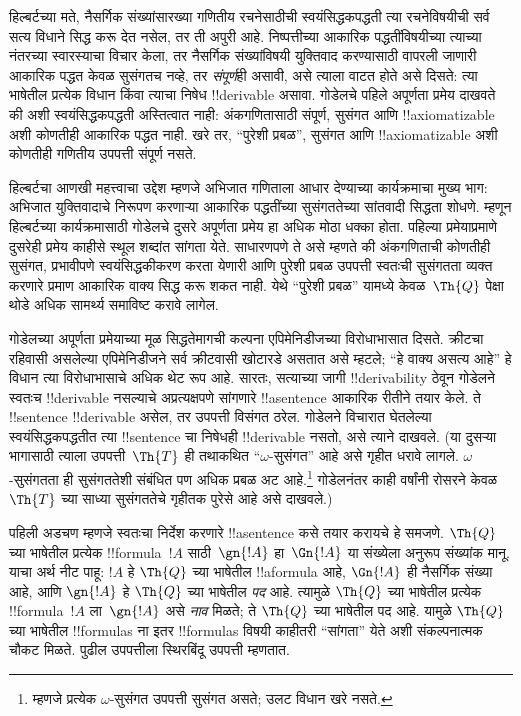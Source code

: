 \documentclass[../../../include/open-logic-section]{subfiles}
\begin{document}


हिल्बर्टच्या मते, नैसर्गिक संख्यांसारख्या गणितीय रचनेसाठीची
स्वयंसिद्धकपद्धती त्या रचनेविषयीची सर्व सत्य विधाने सिद्ध करू देत
नसेल, तर ती अपुरी आहे. निष्पत्तीच्या आकारिक पद्धतींविषयीच्या
त्याच्या नंतरच्या स्वारस्याचा विचार केला, तर नैसर्गिक संख्यांविषयी
युक्तिवाद करण्यासाठी वापरली जाणारी आकारिक पद्धत केवळ सुसंगतच
नव्हे, तर \emph{संपूर्ण}ही असावी, असे त्याला वाटत होते असे दिसते:
त्या भाषेतील प्रत्येक विधान किंवा त्याचा निषेध !!{derivable}
असावा. गोडेलचे पहिले अपूर्णता प्रमेय दाखवते की अशी
स्वयंसिद्धकपद्धती अस्तित्वात नाही: अंकगणितासाठी संपूर्ण, सुसंगत
आणि !!{axiomatizable} अशी कोणतीही आकारिक पद्धत नाही. खरे तर,
“पुरेशी प्रबळ”, सुसंगत आणि !!{axiomatizable} अशी कोणतीही
गणितीय उपपत्ती संपूर्ण नसते.

हिल्बर्टचा आणखी महत्त्वाचा उद्देश म्हणजे अभिजात गणिताला आधार
देण्याच्या कार्यक्रमाचा मुख्य भाग: अभिजात युक्तिवादाचे निरूपण
करणाऱ्या आकारिक पद्धतींच्या सुसंगततेच्या सांतवादी सिद्धता
शोधणे. म्हणून हिल्बर्टच्या कार्यक्रमासाठी गोडेलचे दुसरे
अपूर्णता प्रमेय हा अधिक मोठा धक्का होता. पहिल्या प्रमेयाप्रमाणे
दुसरेही प्रमेय काहीसे स्थूल शब्दांत सांगता येते. साधारणपणे ते
असे म्हणते की अंकगणिताची कोणतीही सुसंगत, प्रभावीपणे
स्वयंसिद्धकीकरण करता येणारी आणि पुरेशी प्रबळ उपपत्ती स्वतःची
सुसंगतता व्यक्त करणारे प्रमाण आकारिक वाक्य सिद्ध करू शकत नाही. येथे “पुरेशी प्रबळ” यामध्ये
केवळ~$\Th{Q}$ पेक्षा थोडे अधिक सामर्थ्य समाविष्ट करावे लागेल.

गोडेलच्या अपूर्णता प्रमेयाच्या मूळ सिद्धतेमागची कल्पना
एपिमेनिडीजच्या विरोधाभासात दिसते. क्रीटचा रहिवासी असलेल्या
एपिमेनिडीजने सर्व क्रीटवासी खोटारडे असतात असे म्हटले;
“हे वाक्य असत्य आहे” हे विधान त्या विरोधाभासाचे अधिक थेट
रूप आहे. सारतः, सत्याच्या जागी !!{derivability} ठेवून गोडेलने
स्वतःच !!{derivable} नसल्याचे अप्रत्यक्षपणे सांगणारे
!!a{sentence} आकारिक रीतीने तयार केले. ते !!{sentence}
!!{derivable} असेल, तर उपपत्ती विसंगत ठरेल. गोडेलने
विचारात घेतलेल्या स्वयंसिद्धकपद्धतीत त्या !!{sentence} चा
निषेधही !!{derivable} नसतो, असे त्याने दाखवले. (या दुसऱ्या
भागासाठी त्याला उपपत्ती~$\Th{T}$ ही तथाकथित
“$\omega$-सुसंगत” आहे असे गृहीत धरावे लागले.
$\omega$-सुसंगतता ही सुसंगततेशी संबंधित पण अधिक प्रबळ अट
आहे.\footnote{म्हणजे प्रत्येक $\omega$-सुसंगत उपपत्ती
सुसंगत असते; उलट विधान खरे नसते.} गोडेलनंतर काही वर्षांनी
रोसरने केवळ~$\Th{T}$ च्या साध्या सुसंगततेचे गृहीतक पुरेसे
आहे असे दाखवले.)

पहिली अडचण म्हणजे स्वतःचा निर्देश करणारे !!a{sentence}
कसे तयार करायचे हे समजणे. $\Th{Q}$ च्या भाषेतील प्रत्येक
!!{formula}~$!A$ साठी~$\gn{!A}$ हा~$\Gn{!A}$ या संख्येला
अनुरूप संख्यांक मानू. याचा अर्थ नीट पाहू: $!A$ हे
$\Th{Q}$ च्या भाषेतील !!a{formula} आहे, $\Gn{!A}$ ही
नैसर्गिक संख्या आहे, आणि $\gn{!A}$ हे $\Th{Q}$ च्या
भाषेतील \emph{पद} आहे. त्यामुळे $\Th{Q}$ च्या भाषेतील
प्रत्येक !!{formula}~$!A$ ला~$\gn{!A}$ असे \emph{नाव}
मिळते; ते $\Th{Q}$ च्या भाषेतील पद आहे. यामुळे
$\Th{Q}$ च्या भाषेतील !!{formula}s ना
इतर !!{formula}s विषयी काहीतरी “सांगता” येते अशी
संकल्पनात्मक चौकट मिळते. पुढील उपपत्तीला स्थिरबिंदू
उपपत्ती म्हणतात.
\end{document}
